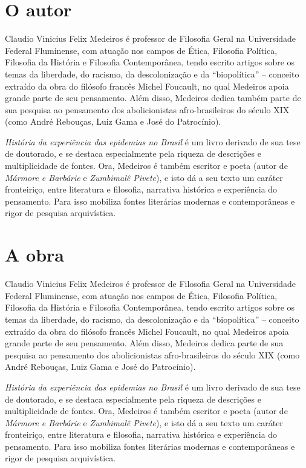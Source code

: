\hypertarget{o-autor}{%
\section{O autor}\label{o-autor}}

Claudio Vinicius Felix Medeiros é professor de Filosofia Geral na
Universidade Federal Fluminense, com atuação nos campos de Ética,
Filosofia Política, Filosofia da História e Filosofia Contemporânea,
tendo escrito artigos sobre os temas da liberdade, do racismo, da
descolonização e da ``biopolítica'' -- conceito extraído da obra do
filósofo francês Michel Foucault, no qual Medeiros apoia grande parte de
seu pensamento. Além disso, Medeiros dedica também parte de sua pesquisa
ao pensamento dos abolicionistas afro-brasileiros do século XIX (como
André Rebouças, Luiz Gama e José do Patrocínio).

\emph{História da experiência das epidemias no Brasil} é um livro
derivado de sua tese de doutorado, e se destaca especialmente pela
riqueza de descrições e multiplicidade de fontes. Ora, Medeiros é também
escritor e poeta (autor de \emph{Mármore e Barbárie} e \emph{Zumbimalê
Pivete}), e isto dá a seu texto um caráter fronteiriço, entre literatura
e filosofia, narrativa histórica e experiência do pensamento. Para isso
mobiliza fontes literárias modernas e contemporâneas e rigor de pesquisa
arquivística.

\hypertarget{a-obra}{%
\section{A obra}\label{a-obra}}

Claudio Vinicius Felix Medeiros é professor de Filosofia Geral na
Universidade Federal Fluminense, com atuação nos campos de Ética,
Filosofia Política, Filosofia da História e Filosofia Contemporânea,
tendo escrito artigos sobre os temas da liberdade, do racismo, da
descolonização e da ``biopolítica'' -- conceito extraído da obra do
filósofo francês Michel Foucault, no qual Medeiros apoia grande parte de
seu pensamento. Além disso, Medeiros dedica parte de sua pesquisa ao
pensamento dos abolicionistas afro-brasileiros do século XIX (como André
Rebouças, Luiz Gama e José do Patrocínio).

\emph{História da experiência das epidemias no Brasil} é um livro
derivado de sua tese de doutorado, e se destaca especialmente pela
riqueza de descrições e multiplicidade de fontes. Ora, Medeiros é também
escritor e poeta (autor de \emph{Mármore e Barbárie} e \emph{Zumbimalê
Pivete}), e isto dá a seu texto um caráter fronteiriço, entre literatura
e filosofia, narrativa histórica e experiência do pensamento. Para isso
mobiliza fontes literárias modernas e contemporâneas e rigor de pesquisa
arquivística.

